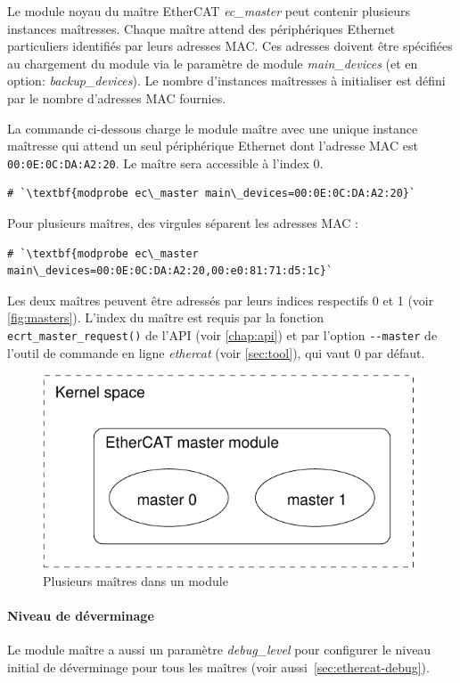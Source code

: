 \documentclass[a4paper,12pt,BCOR6mm,bibtotoc,idxtotoc]{scrbook}
\begin{document}
Le module noyau du ma\^itre EtherCAT \textit{ec\_master} peut contenir
plusieurs instances ma\^itresses. Chaque ma\^itre attend des
p\'eriph\'eriques Ethernet particuliers identifi\'es par leurs adresses
MAC. Ces adresses doivent \^etre sp\'ecifi\'ees au
chargement du module via le param\`etre de module
\textit{main\_devices} (et en option: \textit{backup\_devices}). Le
nombre d'instances ma\^itresses \`a initialiser est d\'efini par le
nombre d'adresses MAC fournies.

La commande ci-dessous charge le module ma\^itre avec une unique
instance ma\^itresse qui attend un seul p\'eriph\'erique Ethernet dont
l'adresse MAC est \lstinline+00:0E:0C:DA:A2:20+. Le ma\^itre sera
accessible \`a l'index $0$.

\begin{lstlisting}
# `\textbf{modprobe ec\_master main\_devices=00:0E:0C:DA:A2:20}`
\end{lstlisting}

Pour plusieurs ma\^itres, des virgules s\'eparent les adresses MAC :

\begin{lstlisting}
# `\textbf{modprobe ec\_master main\_devices=00:0E:0C:DA:A2:20,00:e0:81:71:d5:1c}`
\end{lstlisting}

Les deux ma\^itres peuvent \^etre adress\'es par leurs indices
respectifs 0 et 1 (voir \autoref{fig:masters}). L'index du ma\^itre
est requis par la fonction \lstinline+ecrt_master_request()+ de l'API
(voir \autoref{chap:api}) et par l'option \lstinline+--master+ de
l'outil de commande en ligne \textit{ethercat} (voir
\autoref{sec:tool}), qui vaut $0$ par d\'efaut.

\begin{figure}[htbp]
  \centering
  \includegraphics[width=.5\textwidth]{images/masters}
  \caption{Plusieurs ma\^itres dans un module}
  \label{fig:masters}
\end{figure}

\paragraph{Niveau de d\'everminage} Le module ma\^itre a aussi un
param\`etre \textit{debug\_level} pour configurer le niveau initial de
d\'everminage pour tous les ma\^itres (voir
aussi~\autoref{sec:ethercat-debug}).
\end{document}
